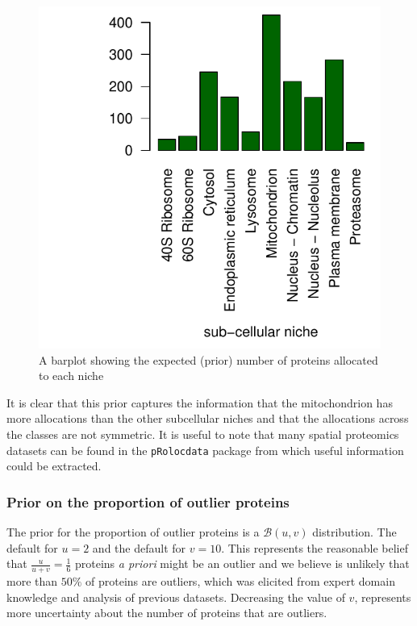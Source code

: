 \documentclass[
]{article}
\begin{document}
\begin{figure}
\includegraphics[width=1\linewidth]{F1000TAGMworkflow_rev1_files/figure-latex/priorpredict-1} \caption{A barplot showing the expected (prior) number of proteins allocated to each niche }\label{fig:priorpredict}
\end{figure}

It is clear that this prior captures the information that the
mitochondrion has more allocations than the other subcellular niches and
that the allocations across the classes are not symmetric. It is useful
to note that many spatial proteomics datasets can be found in the
\texttt{pRolocdata} package from which useful information could be
extracted.

\hypertarget{prior-on-the-proportion-of-outlier-proteins}{%
\subsubsection{Prior on the proportion of outlier
proteins}\label{prior-on-the-proportion-of-outlier-proteins}}

The prior for the proportion of outlier proteins is a
\(\mathcal{B}(u, v)\) distribution. The default for \(u = 2\) and the
default for \(v = 10\). This represents the reasonable belief that
\(\frac{u}{u + v} = \frac{1}{6}\) proteins \emph{a priori} might be an
outlier and we believe is unlikely that more than \(50\%\) of proteins
are outliers, which was elicited from expert domain knowledge and
analysis of previous datasets. Decreasing the value of \(v\), represents
more uncertainty about the number of proteins that are outliers.
\end{document}
